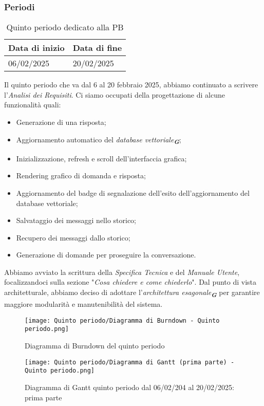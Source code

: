 \subsubsection{Periodi}
\label{sec:periodi}

\label{sec:quinto periodo}
\begin{table}[h!]
    \centering
    \renewcommand{\arraystretch}{1.5} %
    \begin{tabularx}{\textwidth}{|X|X|}\hline
    \rowcolor[HTML]{FFD700} 
    \textbf{Data di inizio} & \textbf{Data di fine} \\ \hline
    06/02/2025 & 20/02/2025 \\ \hline
    \end{tabularx}
    \caption{Quinto periodo dedicato alla PB}
\end{table}
Il quinto periodo che va dal 6 al 20 febbraio 2025, abbiamo continuato a scrivere l'\emph{Analisi dei Requisiti}. Ci siamo occupati della progettazione di alcune funzionalità quali:
\begin{itemize}
\item Generazione di una risposta;
\item Aggiornamento automatico del {\emph{database vettoriale}}\textsubscript{\textit{\textbf{G}}};
\item Inizializzazione, refresh e scroll dell'interfaccia grafica;
\item Rendering grafico di domanda e risposta;
\item Aggiornamento del badge di segnalazione dell'esito dell'aggiornamento del database vettoriale;
\item Salvataggio dei messaggi nello storico;
\item Recupero dei messaggi dallo storico;
\item Generazione di domande per proseguire la conversazione.
\end{itemize}
Abbiamo avviato la scrittura della \emph{Specifica Tecnica} e del \emph{Manuale Utente}, focalizzandoci sulla sezione "\emph{Cosa chiedere e come chiederlo}".
Dal punto di vista architetturale, abbiamo deciso di adottare l’{\emph{architettura esagonale}}\textsubscript{\textit{\textbf{G}}} per garantire maggiore modularità e manutenibilità del sistema. 

\newpage
\begin{figure}[h] 
    \centering
    \texttt{[image: Quinto periodo/Diagramma di Burndown - Quinto periodo.png]}
    \caption{Diagramma di Burndown del quinto periodo} 
    \label{fig: Diagramma di Burndown del quinto periodo}
\end{figure}
\newpage
\begin{figure}[h] 
    \centering
    \texttt{[image: Quinto periodo/Diagramma di Gantt (prima parte) - Quinto periodo.png]}
    \caption{Diagramma di Gantt quinto periodo dal 06/02/204 al 20/02/2025: prima parte} 
    \label{fig: Diagramma di Gantt quinto periodo dal 06/02/204 al 20/02/2025: prima parte}
\end{figure}
\newpage


